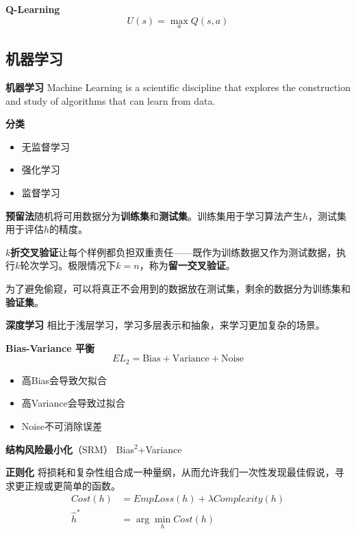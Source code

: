 \documentclass[10pt,a4paper]{ctexart}
\begin{document}
\begin{multicols}{3}
        \textbf{Q-Learning}
        \begin{equation*}
            U(s)=\max_a Q(s,a)
        \end{equation*}

        \subsection{机器学习}
        \textbf{机器学习}
        Machine Learning is a scientific discipline that explores the construction and study of algorithms that can learn from data.

        \textbf{分类}
        \begin{itemize}
            \item 无监督学习
            \item 强化学习
            \item 监督学习
        \end{itemize}

        \textbf{预留法}随机将可用数据分为\textbf{训练集}和\textbf{测试集}。训练集用于学习算法产生$h$，测试集用于评估$h$的精度。
        
        \textbf{$k$折交叉验证}让每个样例都负担双重责任------既作为训练数据又作为测试数据，执行$k$轮次学习。极限情况下$k=n$，称为\textbf{留一交叉验证}。

        为了避免偷窥，可以将真正不会用到的数据放在测试集，剩余的数据分为训练集和\textbf{验证集}。

        \textbf{深度学习}
        相比于浅层学习，学习多层表示和抽象，来学习更加复杂的场景。

        \textbf{Bias-Variance 平衡}
        \begin{equation*}
            EL_2=\text{Bias}+\text{Variance}+\text{Noise}
        \end{equation*}
        \begin{itemize}
            \item 高Bias会导致欠拟合
            \item 高Variance会导致过拟合
            \item Noise不可消除误差
        \end{itemize}

        \textbf{结构风险最小化}（SRM） Bias$^2$+Variance

        \textbf{正则化}
        将损耗和复杂性组合成一种量纲，从而允许我们一次性发现最佳假说，寻求更正规或更简单的函数。
        \begin{align*}
            \mathit{Cost}(h)&=\mathit{EmpLoss}(h)+\lambda\mathit{Complexity}(h)\\
            \hat{h}^*&=\arg\min_h \mathit{Cost}(h)
        \end{align*}


\end{multicols}
\end{document}
